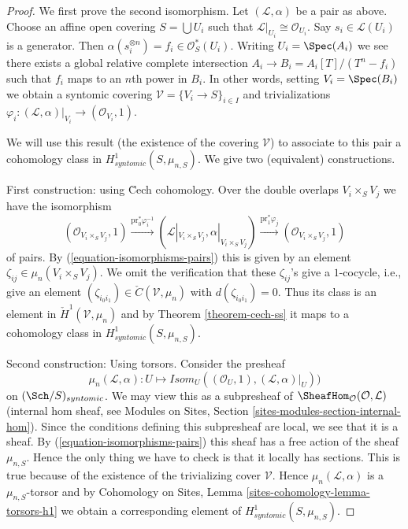 \begin{proof}
We first prove the second isomorphism.
Let $(\mathcal{L}, \alpha)$ be a pair as above.
Choose an affine open covering $S = \bigcup U_i$ such that
$\mathcal{L}|_{U_i} \cong \mathcal{O}_{U_i}$. Say $s_i \in \mathcal{L}(U_i)$
is a generator. Then $\alpha(s_i^{\otimes n}) = f_i \in \mathcal{O}_S^*(U_i)$.
Writing $U_i = \Spec(A_i)$ we see there exists a global
relative complete intersection $A_i \to B_i = A_i[T]/(T^n - f_i)$
such that $f_i$ maps to an $n$th power in $B_i$. In other words, setting
$V_i = \Spec(B_i)$ we obtain a syntomic covering
$\mathcal{V} = \{V_i \to S\}_{i \in I}$ and trivializations
$\varphi_i : (\mathcal{L}, \alpha)|_{V_i} \to (\mathcal{O}_{V_i}, 1)$.

\medskip\noindent
We will use this result (the existence of the covering $\mathcal{V}$)
to associate to this pair a cohomology class in
$H^1_{syntomic}(S, \mu_{n, S})$. We give two (equivalent) constructions.

\medskip\noindent
First construction: using \u Cech cohomology.
Over the double overlaps $V_i \times_S V_j$ we have the isomorphism
$$
(\mathcal{O}_{V_i \times_S V_j}, 1)
\xrightarrow{\text{pr}_0^*\varphi_i^{-1}}
(\mathcal{L}|_{V_i \times_S V_j}, \alpha|_{V_i \times_S V_j})
\xrightarrow{\text{pr}_1^*\varphi_j}
(\mathcal{O}_{V_i \times_S V_j}, 1)
$$
of pairs. By (\ref{equation-isomorphisms-pairs}) this is given by an
element $\zeta_{ij} \in \mu_n(V_i \times_S V_j)$. We omit the verification
that these $\zeta_{ij}$'s give a $1$-cocycle, i.e., give
an element $(\zeta_{i_0i_1}) \in \check C(\mathcal{V}, \mu_n)$
with $d(\zeta_{i_0i_1}) = 0$. Thus its class is an element in
$\check H^1(\mathcal{V}, \mu_n)$ and by
Theorem \ref{theorem-cech-ss}
it maps to a cohomology class in $H^1_{syntomic}(S, \mu_{n, S})$.

\medskip\noindent
Second construction: Using torsors. Consider the presheaf
$$
\mu_n(\mathcal{L}, \alpha) :
U
\longmapsto
\mathit{Isom}_U((\mathcal{O}_U, 1), (\mathcal{L}, \alpha)|_U))
$$
on $(\Sch/S)_{syntomic}$.
We may view this as a subpresheaf of
$\SheafHom_\mathcal{O}(\mathcal{O}, \mathcal{L})$ (internal hom
sheaf, see
Modules on Sites, Section \ref{sites-modules-section-internal-hom}).
Since the conditions defining this subpresheaf are local, we see that it is
a sheaf.
By (\ref{equation-isomorphisms-pairs}) this sheaf has a free action of
the sheaf $\mu_{n, S}$. Hence the only thing we have to check is that
it locally has sections. This is true because of the existence of the
trivializing cover $\mathcal{V}$. Hence $\mu_n(\mathcal{L}, \alpha)$
is a $\mu_{n, S}$-torsor and by
Cohomology on Sites, Lemma \ref{sites-cohomology-lemma-torsors-h1}
we obtain a corresponding element of $H^1_{syntomic}(S, \mu_{n, S})$.


\end{proof}
